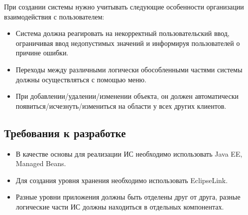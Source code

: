 При создании системы нужно учитывать следующие особенности организации взаимодействия с пользователем:

\begin{itemize}
\item Система должна реагировать на некорректный пользовательский ввод, ограничивая ввод недопустимых значений и информируя пользователей о причине ошибки.
\item Переходы между различными логически обособленными частями системы должны осуществляться с помощью меню.
\item При добавлении/удалении/изменении объекта, он должен автоматически появиться/исчезнуть/измениться на области у всех других клиентов.
\end{itemize}

\subsection{Требования к разработке}

\begin{itemize}
\item В качестве основы для реализации ИС необходимо использовать Java EE, Managed Beans.
\item Для создания уровня хранения необходимо использовать EclipseLink.
\item Разные уровни приложения должны быть отделены друг от друга, разные логические части ИС должны находиться в отдельных компонентах.
\end{itemize}
